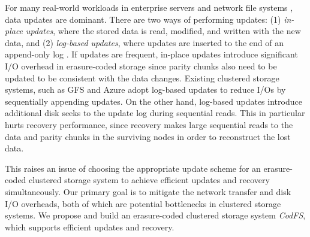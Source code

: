 For many real-world workloads in enterprise servers and network file systems
\cite{adams12,narayanan08}, data updates are dominant.  There are two ways of
performing updates: (1) {\em in-place updates}, where the stored data is read,
modified, and written with the new data, and (2) {\em log-based updates},
where updates are inserted to the end of an append-only log
\cite{rosenblum92}.  If updates are frequent, in-place updates introduce
significant I/O overhead in erasure-coded storage since parity chunks also
need to be updated to be consistent with the data changes.  Existing
clustered storage systems, such as GFS \cite{ghemawat03} and Azure 
\cite{calder11} adopt log-based updates to reduce I/Os by sequentially
appending updates.  On the other hand, log-based updates introduce additional
disk seeks to the update log during sequential reads.  This in particular
hurts recovery performance, since recovery makes large sequential reads to the
data and parity chunks in the surviving nodes in order to reconstruct the lost
data. 

This raises an issue of choosing the appropriate update scheme for an
erasure-coded clustered storage system to achieve efficient updates and
recovery simultaneously.  Our primary goal is to mitigate the network transfer
and disk I/O overheads, both of which are potential bottlenecks in clustered
storage systems. 
We propose and build an erasure-coded clustered storage system {\em CodFS}, 
which supports efficient updates and recovery. 



